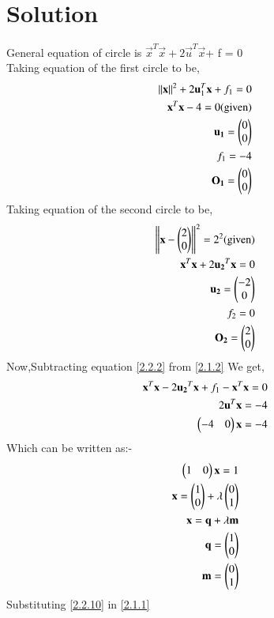 \documentclass[journal,12pt,twocolumn]{IEEEtran}
\begin{document}
  \section{\textbf{Solution}}
General equation of circle is ${\vec{x}^T\vec{x}} + 2\vec{u}^T\vec{x} $+ f = 0\\
 Taking equation of the first circle to be,
 \begin{align}
 \left\lVert\mathbf{x}\right\rVert^2 + 2\mathbf{u}_1^T\mathbf{x} + f_1 = 0\label{2.1.1}\\
 {\mathbf{x}^{T}\mathbf{x}}-4=0 \label{2.1.2}\text{(given)}\\
 \mathbf{u_1}=\begin{pmatrix}0\\0\end{pmatrix}\\
 f_1=-4\\
\mathbf{O_1}=\begin{pmatrix}0\\0\end{pmatrix}
 \end{align}
Taking equation of the second circle to be,
\begin{align}
  \left\lVert\mathbf{x}-\begin{pmatrix}2\\0\end{pmatrix}\right\rVert^2=2^2 \text{(given)}\\
  {\mathbf{x}^{T}\mathbf{x}+2\mathbf{u_2}^T\mathbf{x}}=0 \label{2.2.2}\\
  \mathbf{u_2}=\begin{pmatrix}-2\\0\end{pmatrix}\\
 f_2=0\\
 \mathbf{O_2}=\begin{pmatrix}2\\0\end{pmatrix}
  \end{align}
 Now,Subtracting equation \eqref{2.2.2} from \eqref{2.1.2} We get,
 \begin{align}
 \mathbf{x}^T\mathbf{x}-2\mathbf{u_2}^T\mathbf{x}+f_1-\mathbf{x}^{T}\mathbf{x}=0\\
 2\mathbf{u}^{T}\mathbf{x}=-4\\
 \begin{pmatrix}-4&0\end{pmatrix}\mathbf{x}=-4
 \end{align}
 Which can be written as:-
 \begin{align}
 \begin{pmatrix}1&0\end{pmatrix}\mathbf{x}=1\\
 \mathbf{x}=\begin{pmatrix}1 \\ 0\end{pmatrix} + \lambda \begin{pmatrix}0\\1\end{pmatrix}\\
\mathbf{x}=\mathbf{q}+\lambda\mathbf{m}\label{2.2.10}\\
\mathbf{q}=\begin{pmatrix}1 \\ 0\end{pmatrix} \\
\mathbf{m}=\begin{pmatrix}0\\1\end{pmatrix}
  \end{align}
 Substituting \eqref{2.2.10} in \eqref{2.1.1}
\end{document}
